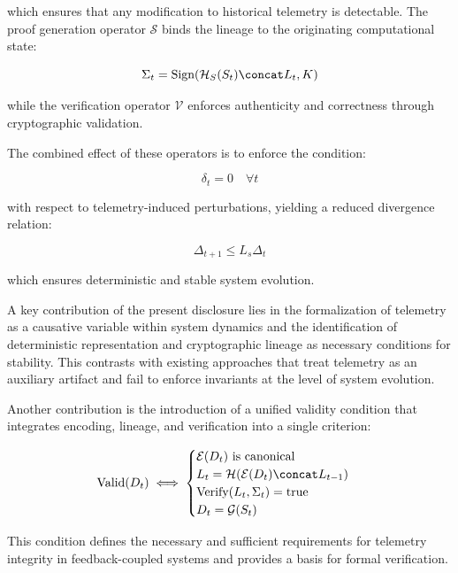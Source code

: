 which ensures that any modification to historical telemetry is detectable. The proof generation operator $\mathcal{S}$ binds the lineage to the originating computational state:

\begin{equation}
\Sigma_t = \text{Sign}(\mathcal{H}_S(S_t) \concat L_t, K)
\end{equation}

while the verification operator $\mathcal{V}$ enforces authenticity and correctness through cryptographic validation.

The combined effect of these operators is to enforce the condition:

\begin{equation}
\delta_t = 0 \quad \forall t
\end{equation}

with respect to telemetry-induced perturbations, yielding a reduced divergence relation:

\begin{equation}
\Delta_{t+1} \leq L_s \Delta_t
\end{equation}

which ensures deterministic and stable system evolution.

A key contribution of the present disclosure lies in the formalization of telemetry as a causative variable within system dynamics and the identification of deterministic representation and cryptographic lineage as necessary conditions for stability. This contrasts with existing approaches that treat telemetry as an auxiliary artifact and fail to enforce invariants at the level of system evolution.

Another contribution is the introduction of a unified validity condition that integrates encoding, lineage, and verification into a single criterion:

\begin{equation}
\text{Valid}(D_t) \iff 
\begin{cases}
\mathcal{E}(D_t) \text{ is canonical} \\
L_t = \mathcal{H}(\mathcal{E}(D_t) \concat L_{t-1}) \\
\text{Verify}(L_t, \Sigma_t) = \text{true} \\
D_t = \mathcal{G}(S_t)
\end{cases}
\end{equation}

This condition defines the necessary and sufficient requirements for telemetry integrity in feedback-coupled systems and provides a basis for formal verification.

